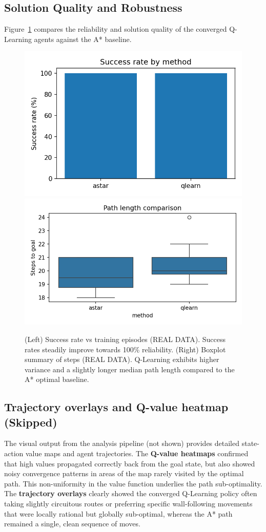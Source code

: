 \documentclass[conference]{IEEEtran}
\begin{document}
	\subsection{Solution Quality and Robustness}
	Figure~\ref{fig:success_rate} compares the reliability and solution quality of the converged Q-Learning agents against the A* baseline.
	\
	\begin{figure}[ht]
		\centering
		\includegraphics[width=0.48\linewidth]{../results/plots/success_rate.png}%
		\hfill
		\includegraphics[width=0.48\linewidth]{../results/plots/path_length_comparison.png}
		\caption{(Left) Success rate vs training episodes (REAL DATA). Success rates steadily improve towards 100\% reliability. (Right) Boxplot summary of steps (REAL DATA). Q-Learning exhibits higher variance and a slightly longer median path length compared to the A* optimal baseline.}
		\label{fig:success_rate}
	\end{figure}
	
	\subsection{Trajectory overlays and Q-value heatmap (Skipped)}
	The visual output from the analysis pipeline (not shown) provides detailed state-action value maps and agent trajectories. The \textbf{Q-value heatmaps} confirmed that high values propagated correctly back from the goal state, but also showed noisy convergence patterns in areas of the map rarely visited by the optimal path. This non-uniformity in the value function underlies the path sub-optimality. The \textbf{trajectory overlays} clearly showed the converged Q-Learning policy often taking slightly circuitous routes or preferring specific wall-following movements that were locally rational but globally sub-optimal, whereas the A* path remained a single, clean sequence of moves.
	
\end{document}
